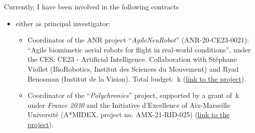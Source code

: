 \documentclass[10pt,english,a4paper,oneside]{article}%
\begin{document}
Currently, I have been involved in the following contracts
\begin{itemize}
\item either as principal investigator:
\begin{itemize}

	\item Coordinator of the ANR project ``\textit{AgileNeuRobot}'' (ANR-20-CE23-0021): ``Agile biomimetic aerial robots for flight in real-world conditions'', under the CES: CE23 - Artificial Intelligence. Collaboration with Stéphane Viollet (BioRobotics, Institut des Sciences du Mouvement) and Ryad Benosman (Institut de la Vision). Total budget: \,k (\href{https://laurentperrinet.github.io/grant/anr-anr/}{link to the project}).

	\item Coordinator of the ``\textit{Polychronies}'' project, supported by a grant of \,k under \textit{France 2030} and the Initiative d'Excellence of Aix-Marseille Université (A*MIDEX, project no. AMX-21-RID-025) (\href{https://laurentperrinet.github.io/grant/polychronies/}{link to the project}).
\end{itemize}


\end{itemize}
\end{document}
